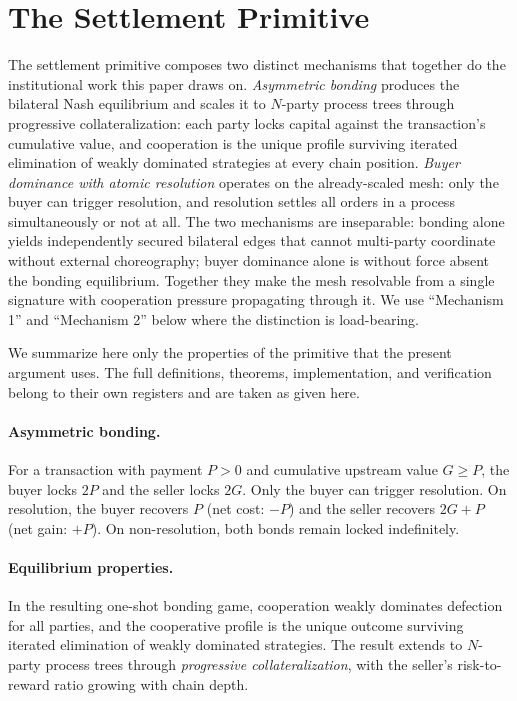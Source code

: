 \documentclass[11pt,a4paper]{article}
\theoremstyle{definition}
\theoremstyle{remark}
\newcommand{\pay}{P}
\newcommand{\cumval}{G}
\begin{document}
\section{The Settlement Primitive}
\label{sec:primitive}

The settlement primitive composes two distinct mechanisms that
together do the institutional work this paper draws on.
\emph{Asymmetric bonding} produces the bilateral Nash equilibrium
and scales it to $N$-party process trees through progressive
collateralization: each party locks capital against the
transaction's cumulative value, and cooperation is the unique
profile surviving iterated elimination of weakly dominated
strategies at every chain position. \emph{Buyer dominance with
atomic resolution} operates on the already-scaled mesh: only the
buyer can trigger resolution, and resolution settles all orders in
a process simultaneously or not at all. The two mechanisms are
inseparable: bonding alone yields independently secured bilateral
edges that cannot multi-party coordinate without external
choreography; buyer dominance alone is without force absent the
bonding equilibrium. Together they make the mesh resolvable from a
single signature with cooperation pressure propagating through it.
We use ``Mechanism 1'' and ``Mechanism 2'' below where the
distinction is load-bearing.

We summarize here only the properties of the primitive that the
present argument uses. The full definitions, theorems,
implementation, and verification belong to their own registers
and are taken as given here.

\paragraph{Asymmetric bonding.}
For a transaction with payment $\pay > 0$ and cumulative upstream
value $\cumval \geq \pay$, the buyer locks $2\pay$ and the seller
locks $2\cumval$. Only the buyer can trigger resolution. On
resolution, the buyer recovers $\pay$ (net cost: $-\pay$) and the
seller recovers $2\cumval + \pay$ (net gain: $+\pay$). On
non-resolution, both bonds remain locked indefinitely.

\paragraph{Equilibrium properties.}
In the resulting one-shot bonding game, cooperation weakly dominates
defection for all parties, and the cooperative profile is the unique
outcome surviving iterated elimination of weakly dominated
strategies. The result extends to $N$-party process trees through
\emph{progressive collateralization}, with the seller's
risk-to-reward ratio growing with chain depth.
\end{document}
